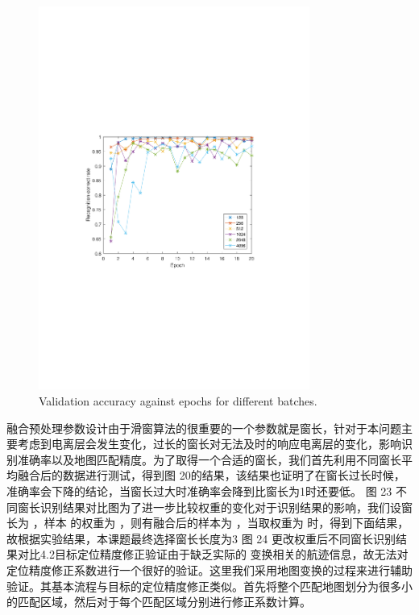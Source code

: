 \begin{figure}[!t]
	\centering
	\includegraphics[width=3.5in]{figures/epoch}
	\caption{Validation accuracy against epochs for different batches.}
	\label{fig:epoch}
\end{figure}

融合预处理参数设计由于滑窗算法的很重要的一个参数就是窗长，针对于本问题主要考虑到电离层会发生变化，过长的窗长对无法及时的响应电离层的变化，影响识别准确率以及地图匹配精度。为了取得一个合适的窗长，我们首先利用不同窗长平均融合后的数据进行测试，得到图 20的结果，该结果也证明了在窗长过长时候，准确率会下降的结论，当窗长过大时准确率会降到比窗长为1时还要低。 图 23 不同窗长识别结果对比图为了进一步比较权重的变化对于识别结果的影响，我们设窗长为 ，样本 的权重为 ，则有融合后的样本为 ，当取权重为 时，得到下面结果，故根据实验结果，本课题最终选择窗长长度为3 图 24 更改权重后不同窗长识别结果对比4.2目标定位精度修正验证由于缺乏实际的 变换相关的航迹信息，故无法对定位精度修正系数进行一个很好的验证。这里我们采用地图变换的过程来进行辅助验证。其基本流程与目标的定位精度修正类似。首先将整个匹配地图划分为很多小的匹配区域，然后对于每个匹配区域分别进行修正系数计算。

